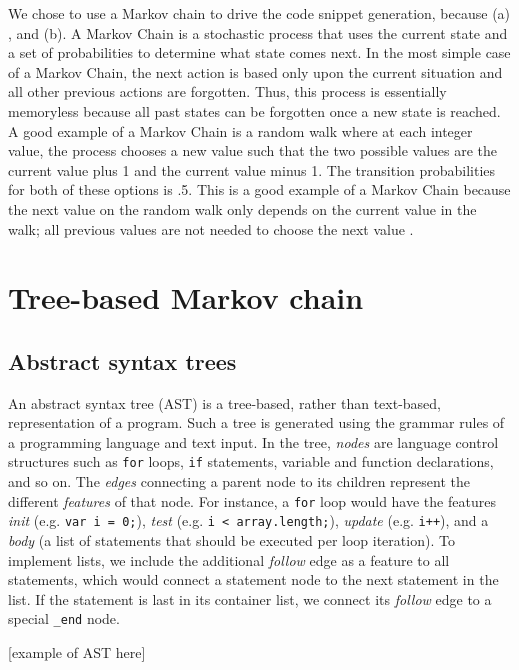 \documentclass{article}
\begin{document}
We chose to use a Markov chain to drive the code snippet generation, because
(a) , and (b). A Markov Chain is a stochastic process
that uses the current state and a set of probabilities to determine what state
comes next. In the most simple case of a Markov Chain, the next action is based
only upon the current situation and all other previous actions are forgotten.
Thus, this process is essentially memoryless because all past states can be
forgotten once a new state is reached. A good example of a Markov Chain is a
random walk where at each integer value, the process chooses a new value such
that the two possible values are the current value plus 1 and the current value
minus 1. The transition probabilities for both of these options is .5. This is a
good example of a Markov Chain because the next value on the random walk only
depends on the current value in the walk; all previous values are not needed to
choose the next value \cite{markov}.


\section{Tree-based Markov chain}

\subsection{Abstract syntax trees}

An abstract syntax tree (AST) is a tree-based, rather than text-based, representation of a program.
Such a tree is generated using the grammar rules of a programming language and text input. In the tree, \emph{nodes}
are language control structures such as {\tt for} loops, {\tt if} statements, variable and function
declarations, and so on. The \emph{edges} connecting a parent node to its children represent the different \emph{features}
of that node. For instance, a {\tt for} loop would have the features \emph{init} (e.g. {\tt var i = 0;}),
\emph{test} (e.g. {\tt i < array.length;}), \emph{update} (e.g. {\tt i++}), and a \emph{body} (a list
of statements that should be executed per loop iteration). To implement lists, we include the additional
\emph{follow} edge as a feature to all statements, which would connect a statement node to the next statement
in the list. If the statement is last in its container list, we connect its \emph{follow} edge to a special
{\tt {\_end}} node.

\begin{center}


[example of AST here]




\end{center}
\end{document}
